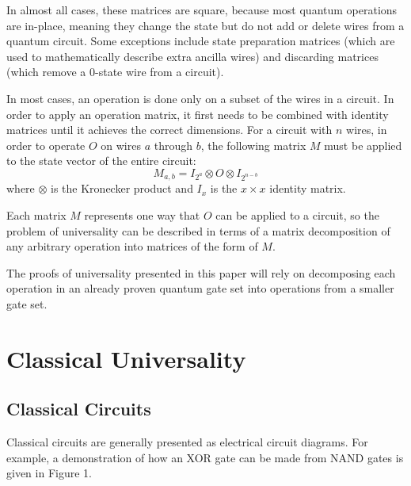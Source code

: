 \documentclass[12pt]{article}
\begin{document}
In almost all cases, these matrices are square, because most quantum operations are in-place, meaning they change the state but do not add or delete wires from a quantum circuit. Some exceptions include state preparation matrices (which are used to mathematically describe extra ancilla wires) and discarding matrices (which remove a 0-state wire from a circuit).

In most cases, an operation is done only on a subset of the wires in a circuit. In order to apply an operation matrix, it first needs to be combined with identity matrices until it achieves the correct dimensions. For a circuit with $n$ wires, in order to operate $O$ on wires $a$ through $b$, the following matrix $M$ must be applied to the state vector of the entire circuit:
$$
M_{a, b} = I_{2^a} \otimes O \otimes I_{2^{n - b}}
$$
where $\otimes$ is the Kronecker product and $I_x$ is the $x \times x$ identity matrix.

Each matrix $M$ represents one way that $O$ can be applied to a circuit, so the problem of universality can be described in terms of a matrix decomposition of any arbitrary operation into matrices of the form of $M$.

The proofs of universality presented in this paper will rely on decomposing each operation in an already proven quantum gate set into operations from a smaller gate set.

\section{Classical Universality}
\subsection{Classical Circuits}
Classical circuits are generally presented as electrical circuit diagrams. For example, a demonstration of how an XOR gate can be made from NAND gates is given in Figure 1.
\end{document}
